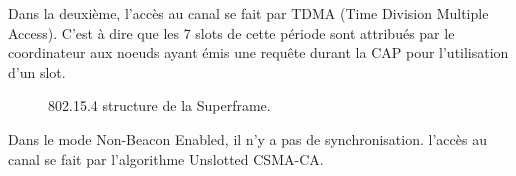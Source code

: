     Dans la deuxième, l'accès au canal se fait par TDMA (Time Division Multiple Access). C'est à dire que les 7 slots de cette période sont attribués par le coordinateur aux noeuds ayant émis une requête durant la CAP pour l'utilisation d'un slot.

    \begin{figure}[H]
        \centering
        \caption{802.15.4 structure de la Superframe.}
        \label{fig:etat_art-802.15.4.superframe}
    \end{figure}

    Dans le mode Non-Beacon Enabled, il n'y a pas de synchronisation. l'accès au canal se fait par l'algorithme Unslotted CSMA-CA.


